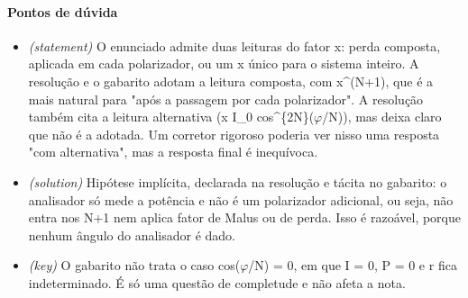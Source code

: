 \documentclass{article}%
\begin{document}
\paragraph{Pontos de dúvida}%
\begin{itemize}%
\item%
\textit{(statement)} O enunciado admite duas leituras do fator x: perda composta, aplicada em cada polarizador, ou um x único para o sistema inteiro. A resolução e o gabarito adotam a leitura composta, com x\^{}(N+1), que é a mais natural para "após a passagem por cada polarizador". A resolução também cita a leitura alternativa (x I\_0 cos\^{}\{2N\}($\varphi$/N)), mas deixa claro que não é a adotada. Um corretor rigoroso poderia ver nisso uma resposta "com alternativa", mas a resposta final é inequívoca.%
\item%
\textit{(solution)} Hipótese implícita, declarada na resolução e tácita no gabarito: o analisador só mede a potência e não é um polarizador adicional, ou seja, não entra nos N+1 nem aplica fator de Malus ou de perda. Isso é razoável, porque nenhum ângulo do analisador é dado.%
\item%
\textit{(key)} O gabarito não trata o caso cos($\varphi$/N) = 0, em que I = 0, P = 0 e r fica indeterminado. É só uma questão de completude e não afeta a nota.%
\end{itemize}%
\end{document}
